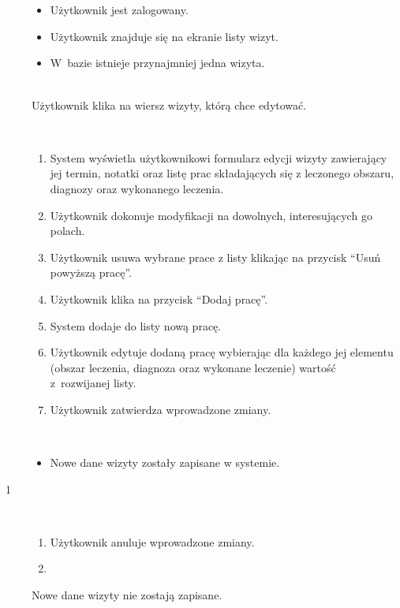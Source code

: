 \documentclass[11pt]{aghdpl}
\begin{document}
	\begin{description}
		\item[\useCaseAktor] \hfill \\
			\useCaseUzytkownik
		\item[\useCaseWarPocz] \hfill \\
			\begin{itemize}
				\item Użytkownik jest zalogowany.
				\item Użytkownik znajduje się na ekranie listy wizyt.
				\item W~bazie istnieje przynajmniej jedna wizyta.
			\end{itemize}
		\item[\useCaseZdarzInicj] \hfill \\
			Użytkownik klika na wiersz wizyty, którą chce edytować.
		\item[\useCaseScenBaz] \hfill \\ 
			\begin{enumerate}
				\item System wyświetla użytkownikowi formularz edycji wizyty zawierający jej termin, notatki oraz listę prac składających się z leczonego obszaru, diagnozy oraz wykonanego leczenia.
				\item Użytkownik dokonuje modyfikacji na dowolnych, interesujących go polach.
				\item Użytkownik usuwa wybrane prace z listy klikając na przycisk ``Usuń powyższą pracę''.
				\item Użytkownik klika na przycisk ``Dodaj pracę''.
				\item System dodaje do listy nową pracę.
				\item Użytkownik edytuje dodaną pracę wybierając dla każdego jej elementu (obszar leczenia, diagnoza oraz wykonane leczenie) wartość z~rozwijanej listy.
				\item Użytkownik zatwierdza wprowadzone zmiany.
			\end{enumerate}
		\item[\useCaseWarKonc] \hfill \\ 
			\begin{itemize}
				\item Nowe dane wizyty zostały zapisane w systemie.
			\end{itemize}
			
		\item[\useCaseWyjatek~1] \hfill \\
			\begin{enumerate}[label=7a\arabic*.]
				\item Użytkownik anuluje wprowadzone zmiany.
				\item \useCaseEnd
			\end{enumerate}
			Nowe dane wizyty nie zostają zapisane.
	\end{description}
\end{document}
